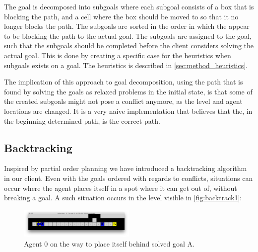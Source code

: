 \documentclass[Main]{subfiles}
\begin{document}
The goal is decomposed into subgoals where each subgoal consists of a box that is blocking the path, and a cell where the box should be moved to so that it no longer blocks the path. The subgoals are sorted in the order in which the appear to be blocking the path to the actual goal. The subgoals are assigned to the goal, such that the subgoals should be completed before the client considers solving the actual goal. This is done by creating a specific case for the heuristics when subgoals exists on a goal. The heuristics is described in \autoref{sec:method_heuristics}. 

The implication of this approach to goal decomposition, using the path that is found by solving the goals as relaxed problems in the initial state, is that some of the created subgoals might not pose a conflict anymore, as the level and agent locations are changed. It is a very naive implementation that believes that the, in the beginning determined path, is the correct path. 


\subsection{Backtracking}

Inspired by partial order planning we have introduced a backtracking algorithm in our client. Even with the goals ordered with regards to conflicts, situations can occur where the agent places itself in a spot where it can get out of, without breaking a goal. A such situation occurs in the level visible in \autoref{fig:backtrack1}:
\begin{figure}[h!]
    \centering
    \includegraphics[width=0.5\textwidth]{backtrack1.png}
    \caption{Agent 0 on the way to place itself behind solved goal A.}
    \label{fig:backtrack1}
\end{figure}
\end{document}
